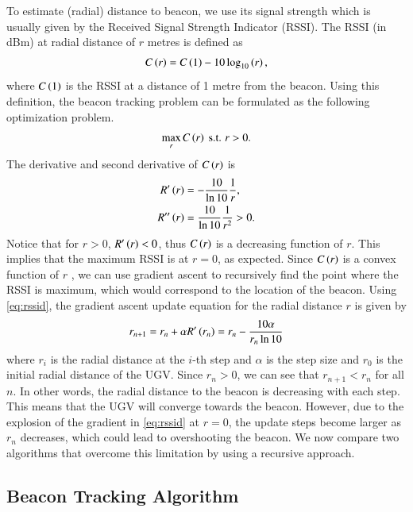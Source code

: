 \documentclass[conference]{IEEEtran}
\begin{document}
To estimate (radial) distance to beacon, we use its signal strength which is
usually given by the Received Signal Strength Indicator (RSSI). The RSSI (in
dBm) at radial distance of \(r\) metres is defined as
\begin{align}
    C\left(r\right) = C\left(1\right) - 10\log_{10}\left(r\right),
    \label{eq:rssi}
\end{align}
where \(C\left(1\right)\) is the RSSI at a distance of 1 metre from the beacon. Using
this definition, the beacon tracking problem can be formulated as the following
optimization problem.
\begin{equation}
    \max_{r} C\left(r\right) \text{ s.t. } r > 0.
    \label{eq:rssopt}
\end{equation}
The derivative and second derivative of \(C\left(r\right)\) is
\begin{align}
    R^\prime\left(r\right) &= -\frac{10}{\ln{10}}\frac{1}{r}, \label{eq:rssid} \\
    R^{\prime\prime}\left(r\right) &= \frac{10}{\ln{10}}\frac{1}{r^2} > 0. \label{eq:rssidd}
\end{align}
Notice that for \(r > 0\), \(R^\prime\left(r\right) < 0\), thus \(C\left(r\right)\) is a
decreasing function of \(r\). This implies that the maximum RSSI is at \(r =
0\), as expected. Since \(C\left(r\right)\) is a convex function of \(r\) \cite{}, we can use
gradient ascent \cite{boydConvexOptimization2004a} to recursively find the point
where the RSSI is maximum, which would correspond to the location of the beacon.
Using \eqref{eq:rssid}, the gradient ascent update equation for the radial
distance \(r\) is given by
\begin{equation}
    r_{n+1} = r_n + \alpha R^\prime\left(r_n\right) = r_n - \frac{10\alpha}{r_n\ln{10}}
    \label{eq:gradient-ascent-upd}
\end{equation}
where \(r_i\) is the radial distance at the \(i\)-th step and \(\alpha\) is the
step size and \(r_0\) is the initial radial distance of the UGV. Since \(r_n >
0\), we can see that \(r_{n+1} < r_n\) for all \(n\). In other words, the radial
distance to the beacon is decreasing with each step. This means that the UGV
will converge towards the beacon. However, due to the explosion of the gradient
in \eqref{eq:rssid} at \(r = 0\), the update steps become larger as \(r_n\)
decreases, which could lead to overshooting the beacon. We now compare two
algorithms that overcome this limitation by using a recursive approach.

\subsection{Beacon Tracking Algorithm}
\label{subsec:beacon-tracking-algorithm}
\end{document}
